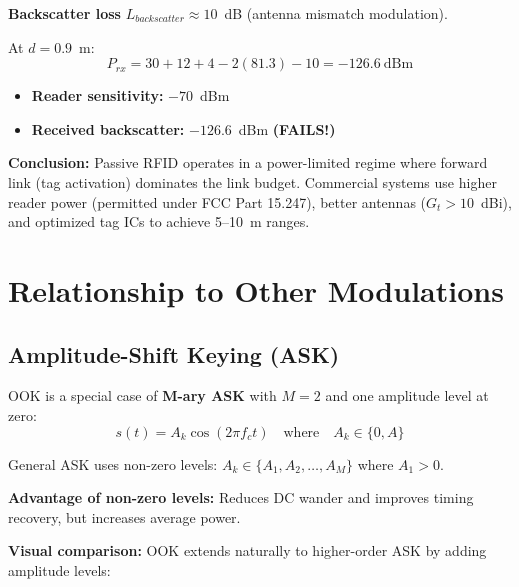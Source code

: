 \textbf{Backscatter loss} $L_{backscatter} \approx 10$~dB (antenna mismatch modulation).

At $d = 0.9$~m:
\begin{equation}
P_{rx} = 30 + 12 + 4 - 2(81.3) - 10 = -126.6~\text{dBm}
\end{equation}

\begin{itemize}
\item \textbf{Reader sensitivity:} $-70$~dBm
\item \textbf{Received backscatter:} $-126.6$~dBm \textbf{(FAILS!)}
\end{itemize}

\textbf{Conclusion:} Passive RFID operates in a power-limited regime where forward link (tag activation) dominates the link budget. Commercial systems use higher reader power (permitted under FCC Part 15.247), better antennas ($G_t > 10$~dBi), and optimized tag ICs to achieve 5--10~m ranges.

\section{Relationship to Other Modulations}

\subsection{Amplitude-Shift Keying (ASK)}

OOK is a special case of \textbf{M-ary ASK} with $M = 2$ and one amplitude level at zero:
\begin{equation}
s(t) = A_k \cos(2\pi f_c t) \quad \text{where} \quad A_k \in \{0, A\}
\end{equation}

General ASK uses non-zero levels: $A_k \in \{A_1, A_2, \ldots, A_M\}$ where $A_1 > 0$.

\textbf{Advantage of non-zero levels:} Reduces DC wander and improves timing recovery, but increases average power.

\textbf{Visual comparison:} OOK extends naturally to higher-order ASK by adding amplitude levels:


